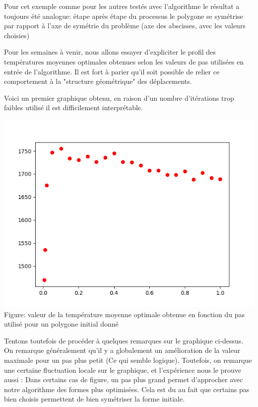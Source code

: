 \documentclass[a4paper,reqno]{article}
\begin{document}
Pour cet exemple comme pour les autres testés avec l'algorithme le résultat a toujours été analogue: étape après étape du processus le polygone se symétrise par rapport à l'axe de symétrie du problème (axe des abscisses, avec les valeurs choisies)\par
Pour les semaines à venir, nous allons essayer d'expliciter le profil des températures moyennes optimales obtenues selon les valeurs de pas utilisées en entrée de l'algorithme. Il est fort à parier qu'il soit possible de relier ce comportement à la "structure géométrique" des déplacements.\par 
Voici un premier graphique obtenu, en raison d'un nombre d'itérations trop faibles utilisé il est difficilement interprétable.\par
\begin{center}
	\includegraphics[scale=0.5]{plotPas.png}
	\\ Figure: valeur de la température moyenne optimale obtenue en fonction du pas utilisé pour un polygone initial donné
\end{center}
Tentons toutefois de procéder à quelques remarques sur le graphique ci-dessus. On remarque généralement qu'il y a globalement un amélioration de la valeur maximale pour un pas plus petit (Ce qui semble logique). Toutefois, on remarque une certaine fluctuation locale sur le graphique, et l'expérience nous le prouve aussi : Dans certains cas de figure, un pas plus grand permet d'approcher avec notre algorithme des formes plus optimisées. Cela est du au fait que certains pas bien choisis permettent de bien symétriser la forme initiale.
\end{document}
